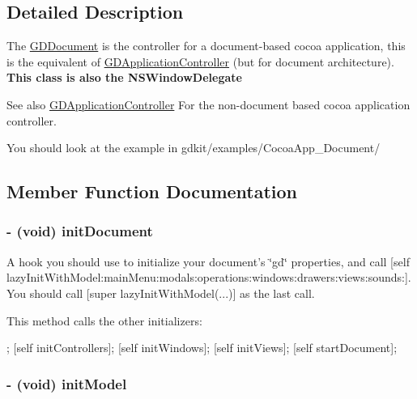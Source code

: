 \subsection{Detailed Description}
The \hyperlink{interface_g_d_document}{GDDocument} is the controller for a document-\/based cocoa application, this is the equivalent of \hyperlink{interface_g_d_application_controller}{GDApplicationController} (but for document architecture). {\bfseries This class is also the NSWindowDelegate}

\begin{DoxySeeAlso}{See also}
\hyperlink{interface_g_d_application_controller}{GDApplicationController} For the non-\/document based cocoa application controller. 

You should look at the example in gdkit/examples/CocoaApp\_\-Document/ 
\end{DoxySeeAlso}


\subsection{Member Function Documentation}
\hypertarget{interface_g_d_document_a182ddb59c8db972db052825787e80154}{
\subsubsection[{initDocument}]{\setlength{\rightskip}{0pt plus 5cm}-\/ (void) initDocument }}
\label{interface_g_d_document_a182ddb59c8db972db052825787e80154}


A hook you should use to initialize your document's \char`\"{}gd\char`\"{} properties, and call \mbox{[}self lazyInitWithModel:mainMenu:modals:operations:windows:drawers:views:sounds:\mbox{]}. You should call \mbox{[}super lazyInitWithModel(...)\mbox{]} as the last call.

This method calls the other initializers:


\begin{DoxyCode}
 ;
 [self initControllers];
 [self initWindows];
 [self initViews];
 [self startDocument];
\end{DoxyCode}
 \hypertarget{interface_g_d_document_a5f93ebfe18cb29f4d3c6664c62b67130}{
\subsubsection[{initModel}]{\setlength{\rightskip}{0pt plus 5cm}-\/ (void) initModel }}
\label{interface_g_d_document_a5f93ebfe18cb29f4d3c6664c62b67130}


